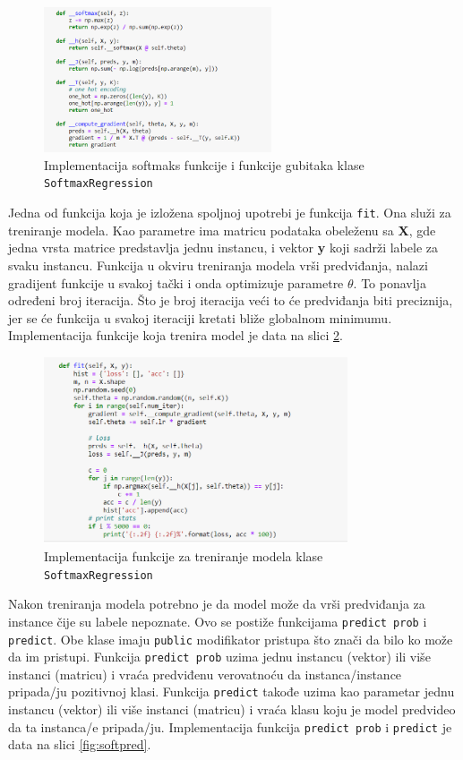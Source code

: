 \documentclass[a4paper,12pt]{report}
\begin{document}
\begin{figure}[h]
    \centering
    \includegraphics[width=0.6\textwidth]{softmax_predict.png}
    \caption{Implementacija softmaks funkcije i funkcije gubitaka klase \texttt{SoftmaxRegression}}\label{fig:softmaxpred}
\end{figure}

Jedna od funkcija koja je izložena spoljnoj upotrebi je funkcija \texttt{fit}. Ona služi za treniranje modela. Kao parametre ima matricu podataka obeleženu sa \textbf{X}, gde jedna vrsta matrice predstavlja jednu instancu, i vektor \textbf{y} koji sadrži labele za svaku instancu. Funkcija u okviru treniranja modela vrši predviđanja, nalazi gradijent funkcije u svakoj tački i onda optimizuje parametre $\theta$. To ponavlja određeni broj iteracija. Što je broj iteracija veći to će predviđanja biti preciznija, jer se će funkcija u svakoj iteraciji kretati bliže globalnom minimumu. Implementacija funkcije koja trenira model je data na slici \ref{fig:softfit}.

\begin{figure}[h]
    \centering
    \includegraphics[width=0.8\textwidth]{softfit.png}
    \caption{Implementacija funkcije za treniranje modela klase \texttt{SoftmaxRegression}}\label{fig:softfit}
\end{figure}

Nakon treniranja modela potrebno je da model može da vrši predviđanja za instance čije su labele nepoznate. Ovo se postiže funkcijama \texttt{predict prob} i \texttt{predict}. Obe klase imaju \texttt{public} modifikator pristupa što znači da bilo ko može da im pristupi. Funkcija \texttt{predict prob} uzima jednu instancu (vektor) ili više instanci (matricu)  i vraća predviđenu verovatnoću da instanca/instance pripada/ju pozitivnoj klasi. Funkcija \texttt{predict} takođe uzima kao parametar jednu instancu (vektor) ili više instanci (matricu) i vraća klasu koju je model predvideo da ta instanca/e pripada/ju.  Implementacija funkcija \texttt{predict prob} i \texttt{predict} je data na slici \ref{fig:softpred}.
\end{document}
